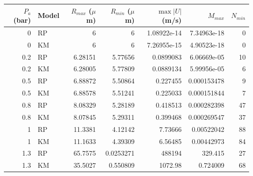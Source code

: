 \begin{tabular}{rlrrrrr}
\toprule
$P_a$ (bar) & Model & $R_{max}$ ($\mu$m) & $R_{min}$ ($\mu$m) & $\max|U|$ (m/s) & $M_{max}$ & $N_{min}$\\\midrule
0 & RP & 6 & 6 & 1.08922e-14 & 7.34963e-18 & 0\\
0 & KM & 6 & 6 & 7.26955e-15 & 4.90523e-18 & 0\\
0.2 & RP & 6.28151 & 5.77656 & 0.0899083 & 6.06669e-05 & 10\\
0.2 & KM & 6.28005 & 5.77809 & 0.0889134 & 5.99956e-05 & 6\\
0.5 & RP & 6.88872 & 5.50864 & 0.227455 & 0.000153478 & 9\\
0.5 & KM & 6.88578 & 5.51241 & 0.225033 & 0.000151844 & 7\\
0.8 & RP & 8.08329 & 5.28189 & 0.418513 & 0.000282398 & 47\\
0.8 & KM & 8.07845 & 5.29311 & 0.399468 & 0.000269547 & 37\\
1 & RP & 11.3381 & 4.12142 & 7.73666 & 0.00522042 & 88\\
1 & KM & 11.1633 & 4.39309 & 6.56485 & 0.00442973 & 84\\
1.3 & RP & 65.7575 & 0.0253271 & 488194 & 329.415 & 27\\
1.3 & KM & 35.5027 & 0.550809 & 1072.98 & 0.724009 & 68\\
\bottomrule
\end{tabular}
